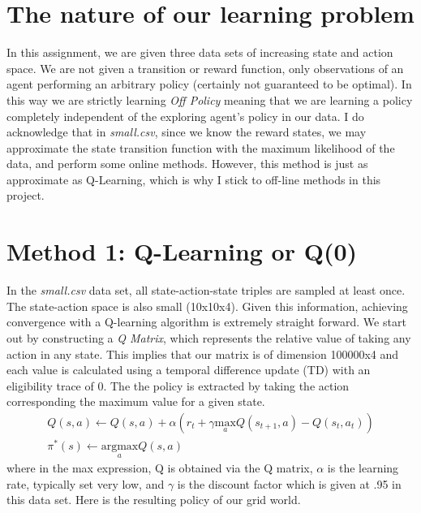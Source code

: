 \documentclass[12pt]{article}
\begin{document}
\maketitle
\section*{The nature of our learning problem}
In this assignment, we are given three data sets of increasing state and action space. We are not given a transition or reward function, only observations of an agent performing an arbitrary policy (certainly not guaranteed to be optimal). In this way we are strictly learning \textit{Off Policy} meaning that we are learning a policy completely independent of the exploring agent's policy in our data. I do acknowledge that in \textit{small.csv}, since we know the reward states, we may approximate the state transition function with the maximum likelihood of the data, and perform some online methods. However, this method is just as approximate as Q-Learning, which is why I stick to off-line methods in this project.
\section*{Method 1: Q-Learning or Q(0)}
In the \textit{small.csv} data set, all state-action-state triples are sampled at least once. The state-action space is also small (10x10x4). Given this information, achieving convergence with a Q-learning algorithm is extremely straight forward. We start out by constructing a \textit{Q Matrix}, which represents the relative value of taking any action in any state. This implies that our matrix is of dimension 100000x4 and each value is calculated using a temporal difference update (TD) with an eligibility trace of 0. The the policy is extracted by taking the action corresponding the maximum value for a given state.
\begin{align}
Q(s,a) \leftarrow Q(s,a) +\alpha(r_t + \gamma\underset{a}{\text{max}}Q(s_{t+1},a) - Q(s_t,a_t))\\
\pi^*(s) \leftarrow \underset{a}{\text{argmax}} Q(s,a)
\end{align}
where in the max expression, Q is obtained via the Q matrix, $\alpha$ is the learning rate, typically set very low, and $\gamma$ is the discount factor which is given at .95 in this data set. Here is the resulting policy of our grid world.
\end{document}
